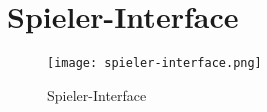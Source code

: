 \section{Spieler-Interface}

%
%
%
%
%
%
%
%


\begin{figure}[ht]
	\centering
	\texttt{[image: spieler-interface.png]}
	\caption{Spieler-Interface}
	\label{fig:spieler-interface}
\end{figure}

